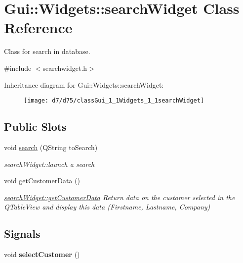 \hypertarget{classGui_1_1Widgets_1_1searchWidget}{\section{Gui\-:\-:Widgets\-:\-:search\-Widget Class Reference}
\label{classGui_1_1Widgets_1_1searchWidget}
}


Class for search in database.  




{\ttfamily \#include $<$searchwidget.\-h$>$}

Inheritance diagram for Gui\-:\-:Widgets\-:\-:search\-Widget\-:\begin{figure}[H]
\begin{center}
\leavevmode
\texttt{[image: d7/d75/classGui\_1\_1Widgets\_1\_1searchWidget]}
\end{center}
\end{figure}
\subsection*{Public Slots}
\begin{DoxyCompactItemize}
\item 
void \hyperlink{classGui_1_1Widgets_1_1searchWidget_adf91225827fde587bea0d0fc803b0034}{search} (Q\-String to\-Search)
\begin{DoxyCompactList}\small\item\em search\-Widget\-::launch a search \end{DoxyCompactList}\item 
\hypertarget{classGui_1_1Widgets_1_1searchWidget_ae9e5a460a5320c8bfad4d6878009ccbc}{void \hyperlink{classGui_1_1Widgets_1_1searchWidget_ae9e5a460a5320c8bfad4d6878009ccbc}{get\-Customer\-Data} ()}\label{classGui_1_1Widgets_1_1searchWidget_ae9e5a460a5320c8bfad4d6878009ccbc}

\begin{DoxyCompactList}\small\item\em \hyperlink{classGui_1_1Widgets_1_1searchWidget_ae9e5a460a5320c8bfad4d6878009ccbc}{search\-Widget\-::get\-Customer\-Data} Return data on the customer selected in the Q\-Table\-View and display this data (Firstname, Lastname, Company) \end{DoxyCompactList}\end{DoxyCompactItemize}
\subsection*{Signals}
\begin{DoxyCompactItemize}
\item 
\hypertarget{classGui_1_1Widgets_1_1searchWidget_a9b6248c515bac4b6f58237c2f73d804b}{void {\bfseries select\-Customer} ()}\label{classGui_1_1Widgets_1_1searchWidget_a9b6248c515bac4b6f58237c2f73d804b}

\end{DoxyCompactItemize}

